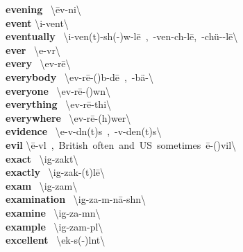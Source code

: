 \documentclass[10pt,a4paper]{article}
\begin{document}
\begin{multicols}{2}
\textbf{ evening }\quad \ \textbackslash \textprimstress \={e}v-ni\engma \textbackslash \\
\textbf{ event }\quad \textbackslash i-\textprimstress vent\textbackslash \\
\textbf{ eventually }\quad \ \textbackslash i-\textprimstress ven(t)-sh(\textschwa -)w\textschwa -l\={e}\ ,\ -\textprimstress ven-ch\textschwa -l\={e},\ -ch\"{u}-\textschwa -l\={e}\textbackslash \\
\textbf{ ever }\quad \ \textbackslash \textprimstress e-v\textschwa r\textbackslash \\
\textbf{ every }\quad \ \textbackslash \textprimstress ev-r\={e}\textbackslash \\
\textbf{ everybody }\quad \ \textbackslash \textprimstress ev-r\={e}-(\textsecstress )b\textschwa -d\={e}\ ,\ -\textsecstress b\"{a}-\textbackslash \\
\textbf{ everyone }\quad \ \textbackslash \textprimstress ev-r\={e}-(\textsecstress )w\textschwa n\textbackslash \\
\textbf{ everything }\quad \ \textbackslash \textprimstress ev-r\={e}-\textsecstress thi\engma \textbackslash \\
\textbf{ everywhere }\quad \ \textbackslash \textprimstress ev-r\={e}-\textsecstress (h)wer\textbackslash \\
\textbf{ evidence }\quad \ \textbackslash \textprimstress e-v\textschwa -d\textschwa n(t)s\ ,\ -v\textschwa -\textsecstress den(t)s\textbackslash \\
\textbf{ evil }\quad \textbackslash \textprimstress \={e}-v\textschwa l\ ,\ British\ often\ and\ US\ sometimes\ \textprimstress \={e}-(\textsecstress )vil\textbackslash \\
\textbf{ exact }\quad \ \textbackslash ig-\textprimstress zakt\textbackslash \\
\textbf{ exactly }\quad \ \textbackslash ig-\textprimstress zak-(t)l\={e}\textbackslash \\
\textbf{ exam }\quad \ \textbackslash ig-\textprimstress zam\textbackslash \\
\textbf{ examination }\quad \ \textbackslash ig-\textsecstress za-m\textschwa -\textprimstress n\={a}-sh\textschwa n\textbackslash \\
\textbf{ examine }\quad \ \textbackslash ig-\textprimstress za-m\textschwa n\textbackslash \\
\textbf{ example }\quad \ \textbackslash ig-\textprimstress zam-p\textschwa l\textbackslash \\
\textbf{ excellent }\quad \ \textbackslash \textprimstress ek-s(\textschwa -)l\textschwa nt\textbackslash \\

\end{multicols}
\end{document}
